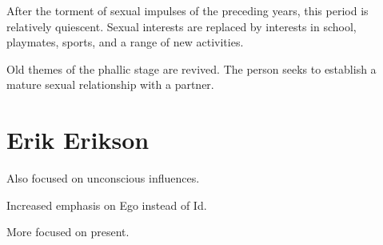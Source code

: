 \begin{coloredlist}
\begin{coloredlist}
\begin{coloredlist}
            \end{coloredlist}
            \item {}
            \begin{coloredlist}
                \item After the torment of sexual impulses of the preceding years, this period is relatively quiescent. Sexual interests are replaced by interests in school, playmates, sports, and a range of new activities. 
            \end{coloredlist}
            \item {}
            \begin{coloredlist}
                \item Old themes of the phallic stage are revived. The person seeks to establish a mature sexual relationship with a partner.
            \end{coloredlist}
        \end{coloredlist}
    \end{coloredlist}

    \section{Erik Erikson}

    \begin{coloredlist}
        \item Also focused on unconscious influences.
        \item Increased emphasis on Ego instead of Id.
        \item More focused on present.
    \end{coloredlist}